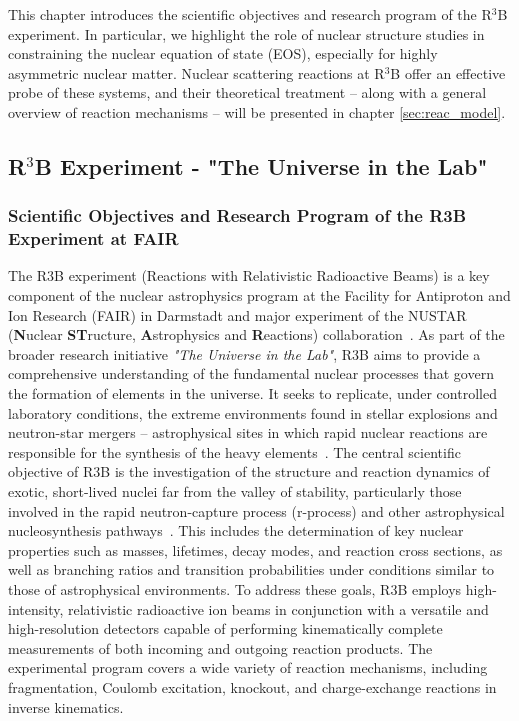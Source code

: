 This chapter introduces the scientific objectives and research program of the R$^3$B experiment. In particular, we highlight the role of nuclear structure studies in constraining the nuclear equation of state (EOS), especially for highly asymmetric nuclear matter. Nuclear scattering reactions at R$^3$B offer an effective probe of these systems, and their theoretical treatment -- along with a general overview of reaction mechanisms -- will be presented in chapter \ref{sec:reac_model}.

\subsection{R$^3$B Experiment - "The Universe in the Lab"}
\subsubsection{Scientific Objectives and Research Program of the R3B Experiment at FAIR}
The R3B experiment (Reactions with Relativistic Radioactive Beams) is a key component of the nuclear astrophysics program at the Facility for Antiproton and Ion Research (FAIR) in Darmstadt and major experiment of the NUSTAR (\textbf{N}uclear \textbf{ST}ructure, \textbf{A}strophysics and \textbf{R}eactions) collaboration~\cite{krucken2005nustar}.\newline
As part of the broader research initiative \textit{"The Universe in the Lab"}, R3B aims to provide a comprehensive understanding of the fundamental nuclear processes that govern the formation of elements in the universe. It seeks to replicate, under controlled laboratory conditions, the extreme environments found in stellar explosions and neutron-star mergers -- astrophysical sites in which rapid nuclear reactions are responsible for the synthesis of the heavy elements~\cite{thielemann2017neutron}.\newline
The central scientific objective of R3B is the investigation of the structure and reaction dynamics of exotic, short-lived nuclei far from the valley of stability, particularly those involved in the rapid neutron-capture process (r-process) and other astrophysical nucleosynthesis pathways~\cite{horowitz2019r}. This includes the determination of key nuclear properties such as masses, lifetimes, decay modes, and reaction cross sections, as well as branching ratios and transition probabilities under conditions similar to those of astrophysical environments.\newline
To address these goals, R3B employs high-intensity, relativistic radioactive ion beams in conjunction with a versatile and high-resolution detectors capable of performing kinematically complete measurements of both incoming and outgoing reaction products. The experimental program covers a wide variety of reaction mechanisms, including fragmentation, Coulomb excitation, knockout, and charge-exchange reactions in inverse kinematics.\newline
